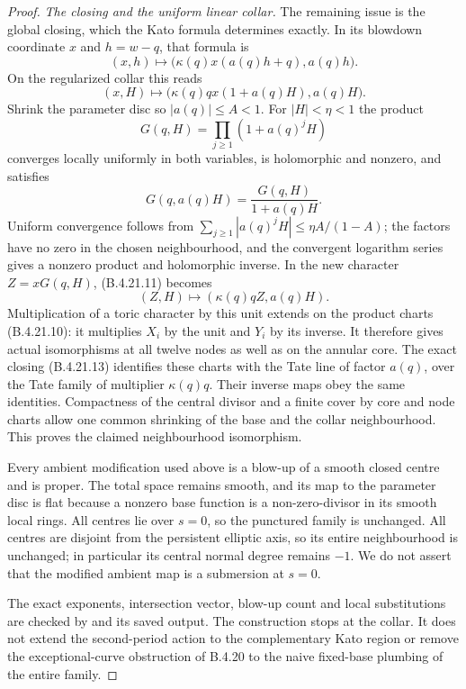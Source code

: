 \begin{proof}
\emph{The closing and the uniform linear collar.}
The remaining issue is the global closing, which the Kato
formula determines exactly.  In its blowdown coordinate $x$
and $h=w-q$, that formula is
\[
 (x,h)\longmapsto
 \bigl(\kappa(q)x(a(q)h+q),a(q)h\bigr).
\]
On the regularized collar this reads
\[
 (x,H)\longmapsto
 \bigl(\kappa(q)q x(1+a(q)H),a(q)H\bigr).
 \tag{B.4.21.11}
\]
Shrink the parameter disc so $|a(q)|\le A<1$.
For $|H|<\eta<1$ the product
\[
 G(q,H)=\prod_{j\ge1}(1+a(q)^jH)
 \tag{B.4.21.12}
\]
converges locally uniformly in both variables, is holomorphic
and nonzero, and satisfies
\[
 G(q,a(q)H)=\frac{G(q,H)}{1+a(q)H}.
\]
Uniform convergence follows from
$\sum_{j\ge1}|a(q)^jH|\le\eta A/(1-A)$; the factors have
no zero in the chosen neighbourhood, and the convergent
logarithm series gives a nonzero product and holomorphic inverse.
In the new character $Z=xG(q,H)$, (B.4.21.11) becomes
\[
 (Z,H)\longmapsto
       (\kappa(q)qZ,a(q)H).
 \tag{B.4.21.13}
\]
Multiplication of a toric character by this unit extends on
the product charts (B.4.21.10): it multiplies $X_i$ by the
unit and $Y_i$ by its inverse.  It therefore gives actual
isomorphisms at all twelve nodes as well as on the annular
core.  The exact closing (B.4.21.13) identifies these charts
with the Tate line of factor $a(q)$, over the Tate family
of multiplier $\kappa(q)q$.  Their inverse maps obey the
same identities.  Compactness of the central divisor and
a finite cover by core and node charts allow one common
shrinking of the base and the collar neighbourhood.
This proves the claimed neighbourhood isomorphism.

Every ambient modification used above is a blow-up of a smooth
closed centre and is proper.  The total space remains smooth,
and its map to the parameter disc is flat because a nonzero
base function is a non-zero-divisor in its smooth local rings.
All centres lie over $s=0$, so the punctured family is unchanged.
All centres are disjoint from the persistent elliptic axis,
so its entire neighbourhood is unchanged; in particular its
central normal degree remains $-1$.
We do not assert that the modified ambient map is a submersion
at $s=0$.

The exact exponents, intersection vector, blow-up count and
local substitutions are checked by
 and its saved
output.  The construction stops at the collar.  It does not
extend the second-period action to the complementary Kato
region or remove the exceptional-curve obstruction of B.4.20
to the naive fixed-base plumbing of the entire family.
\end{proof}
